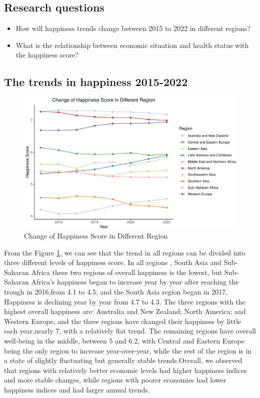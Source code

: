 \documentclass[11pt,a4paper,]{article}
\begin{document}
\hypertarget{research-questions}{%
\subsection{Research questions}\label{research-questions}}

\begin{itemize}
\item
  How will happiness trends change between 2015 to 2022 in different regions?
\item
  What is the relationship between economic situation and health status with the happiness score?
\end{itemize}

\hypertarget{the-trends-in-happiness-2015-2022}{%
\subsection{The trends in happiness 2015-2022}\label{the-trends-in-happiness-2015-2022}}

\begin{figure}
\centering
\includegraphics{Assignment4_files/figure-latex/trends-1.pdf}
\caption{\label{fig:trends}Change of Happiness Score in Different Region}
\end{figure}

From the Figure \ref{fig:trends}, we can see that the trend in all regions can be divided into three different levels of happiness score. In all regions , South Asia and Sub-Saharan Africa these two regions of overall happiness is the lowest, but Sub-Saharan Africa's happiness began to increase year by year after reaching the trough in 2016,from 4.1 to 4.5; and the South Asia region began in 2017, Happiness is declining year by year from 4.7 to 4.3. The three regions with the highest overall happiness are: Australia and New Zealand; North America; and Western Europe, and the three regions have changed their happiness by little each year,nearly 7, with a relatively flat trend. The remaining regions have overall well-being in the middle, between 5 and 6.2, with Central and Eastern Europe being the only region to increase year-over-year, while the rest of the region is in a state of slightly fluctuating but generally stable trends.Overall, we observed that regions with relatively better economic levels had higher happiness indices and more stable changes, while regions with poorer economies had lower happiness indices and had larger annual trends.
\end{document}
